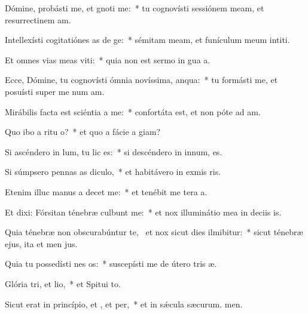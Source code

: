 \item Dómine, probásti me, et gnoti me:~* tu cognovísti sessiónem meam, et resurrectinem am.
\item Intellexísti cogitatiónes as de ge:~* sémitam meam, et funículum meum intiti.
\item Et omnes vias meas viti:~* quia non est sermo in gua a.
\item Ecce, Dómine, tu cognovísti ómnia novíssima,  anqua:~* tu formásti me, et posuísti super me num am.
\item Mirábilis facta est sciéntia a  me:~* confortáta est, et non póte ad am.
\item Quo ibo a ritu o?~* et quo a fácie a giam?
\item Si ascéndero in lum, tu lic es:~* si descéndero in innum, es.
\item Si súmpsero pennas as diculo,~* et habitávero in exmis ris.
\item Etenim illuc manus a decet me:~* et tenébit me tera a.
\item Et dixi: Fórsitan ténebræ culbunt me:~* et nox illuminátio mea in deciis is.
\item Quia ténebræ non obscurabúntur  te,~\pscross{} et nox sicut dies ilmibitur:~* sicut ténebræ ejus, ita et men jus.
\item Quia tu possedísti nes os:~* suscepísti me de útero tris æ.
\item Glória tri, et lio,~* et Spitui to.
\item Sicut erat in princípio, et , et per,~* et in sǽcula sæcurum. men.
